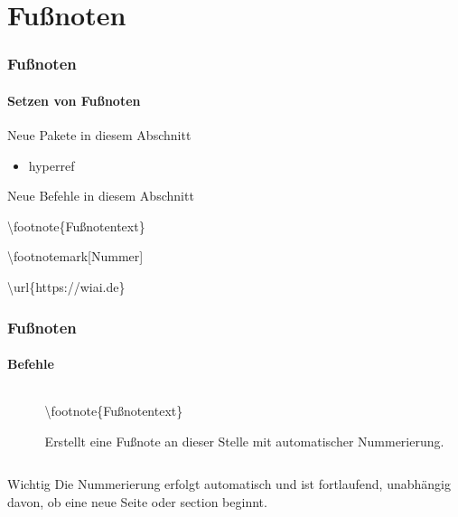 \section{Fu\ss noten}

\begin{frame}
\frametitle{Fu\ss noten}
\framesubtitle{Setzen von Fu\ss noten}
\begin{exampleblock}{Neue Pakete in diesem Abschnitt}
\begin{itemize}
\item hyperref
\end{itemize}
\end{exampleblock}
\begin{block}{Neue Befehle in diesem Abschnitt}
\begin{itemize}
\begin{ttfamily}
\item \color{nounibaredI}\textbackslash footnote\color{black}\{Fu\ss notentext\}
\item \color{nounibaredI}\textbackslash footnotemark\color{nounibagreenI}[Nummer]\color{nounibaredI}
\item \textbackslash url\color{black}\{https://wiai.de\}
\end{ttfamily}
\end{itemize}
\end{block}
\end{frame}


\begin{frame}
\frametitle{Fu\ss noten}
\framesubtitle{Befehle}
\begin{columns}
\begin{column}{0.5\textwidth}
\begin{ttfamily}\scriptsize

\end{ttfamily}
\end{column}
\begin{column}{0.5\textwidth}
\begin{ttfamily}\color{nounibaredI}\textbackslash footnote\color{black}\{Fu\ss notentext\}\end{ttfamily} Erstellt eine Fußnote an dieser Stelle mit automatischer Nummerierung.
\end{column}
\end{columns}
\vspace{-.1cm}
\begin{block}{Wichtig}
Die Nummerierung erfolgt automatisch und ist fortlaufend, unabhängig davon, ob
eine neue Seite oder {\ttfamily section} beginnt.
\end{block}
\end{frame}

